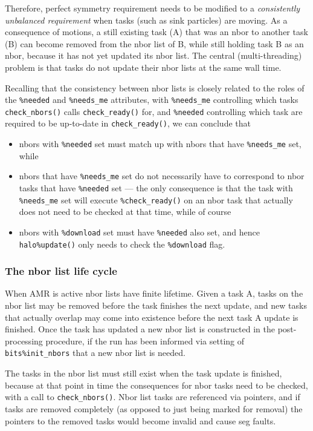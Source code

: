 \documentclass[paper=a4,fontsize=11pt]{scrartcl}
\numberwithin{equation}{section}		%
\numberwithin{figure}{section}			%
\numberwithin{table}{section}				%
\newcommand{\codecolor}{\color{Blue}}
\newcommand{\Code}[1]{{\codecolor\texttt{#1}}}
\def\checknbors{\Code{check\_nbors()}}
\begin{document}
Therefore, perfect symmetry requirement needs to be modified to a \textit{consistently unbalanced requirement} when tasks (such as sink particles) are moving.  As a consequence of motions, a still existing task (A) that was an nbor to another task (B) can become removed from the nbor list of B, while still holding task B as an nbor, because it has not yet updated its nbor list.  The central (multi-threading) problem is that tasks do not update their nbor lists at the same wall time.

Recalling that the consistency between nbor lists is closely related to the roles of the \verb|%needed| and \verb|%needs_me| attributes, with \verb|%needs_me| controlling which tasks \verb|check_nbors()| calls \verb|check_ready()| for, and \verb|%needed| controlling which task are required to be up-to-date in \verb|check_ready()|, we can conclude that
\begin{itemize}
    \item nbors with \verb|%needed| set must match up with nbors that have \verb|%needs_me| set, while
    \item nbors that have \verb|%needs_me| set do not necessarily have to correspond to nbor tasks that have \verb|%needed| set --- the only consequence is that the task with \verb|%needs_me| set will execute \verb|%check_ready()| on an nbor task that actually does not need to be checked at that time, while of course
    \item nbors with \verb|%download| set must have \verb|%needed| also set, and hence \verb|halo%update()| only needs to check the \verb|%download| flag.
\end{itemize}

\subsubsection{The nbor list life cycle}
When AMR is active nbor lists have finite lifetime.  Given a task A, tasks on the nbor list may be removed before the task finishes the next update, and new tasks that actually overlap may come into existence before the next task A update is finished.  Once the task has updated a new nbor list is constructed in the post-processing procedure, if the run has been informed via setting of \verb|bits%init_nbors| that a new nbor list is needed. 

The tasks in the nbor list must still exist when the task update is finished, because at that point in time the consequences for nbor tasks need to be checked, with a call to \checknbors.  Nbor list tasks are referenced via pointers, and if tasks are removed completely (as opposed to just being marked for removal) the pointers to the removed tasks would become invalid and cause seg faults.
\end{document}
